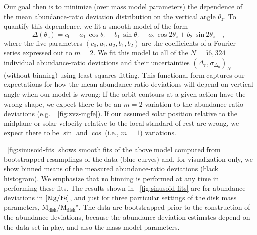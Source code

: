 \documentclass[modern]{aastex63}
\newcommand{\nstars}{56,324}
\newcommand{\mdisk}{\ensuremath{\mathrm{M}_\mathrm{disk}}}
\newcommand{\mratio}{\ensuremath{\mdisk / \mdisk^\star}}
\begin{document}
Our goal then is to minimize (over mass model parameters) the dependence of the
mean abundance-ratio deviation distribution on the vertical angle $\theta_z$.
To quantify this dependence, we fit a smooth model of the form
\begin{equation}
  \Delta(\theta_z) = c_0 + a_1\,\cos  \theta_z + b_1\,\sin    \theta_z
                         + a_2\,\cos 2\theta_z + b_2\,\sin 2\theta_z \quad,
                         \label{eq:fouriermodel}
\end{equation}
where the five parameters $(c_0, a_1, a_2, b_1, b_2)$ are the coefficients of a
Fourier series expressed out to $m=2$.
We fit this model to all of the $N=\nstars$ individual abundance-ratio
deviations and their uncertainties $(\Delta_n, \sigma_{\Delta_n})_N$ (without
binning) using least-squares fitting.
This functional form captures our expectations for how the mean abundance-ratio
deviations will depend on vertical angle when our model is wrong:
If the orbit contours at a given action have the wrong shape, we expect there to
be an $m=2$ variation to the abundance-ratio deviations (e.g.,
\figurename~\ref{fig:zvz-mgfe}).
If our assumed solar position relative to the midplane or solar velocity
relative to the local standard of rest are wrong, we expect there to be $\sin$
and $\cos$ (i.e., $m=1$) variations.

\figurename~\ref{fig:sinusoid-fits} shows smooth fits of the above model
computed from bootstrapped resamplings of the data (blue curves) and, for
visualization only, we show binned means of the measured abundance-ratio
deviations (black histogram).
We emphasize that no binning is performed at any time in performing these fits.
The results shown in \figurename~\ref{fig:sinusoid-fits} are for abundance
deviations in ${[\mathrm{Mg}/\mathrm{Fe}]}$, and just for three particular settings of the disk mass
parameters, \mratio.
The data are bootstrapped prior to the construction of the abundance deviations,
because the abundance-deviation estimates depend on the data set in play, and
also the mass-model parameters.
\end{document}
